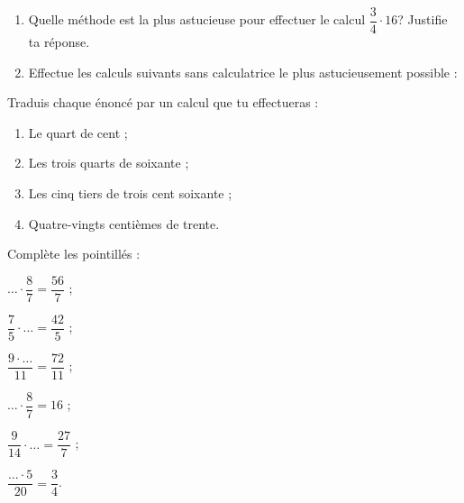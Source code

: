 

\begin{exercice}[Astucieusement]
\begin{enumerate}
 \item Quelle méthode est la plus astucieuse pour effectuer le calcul $\dfrac{3}{4} \cdot 16$? Justifie ta réponse.
 \item Effectue les calculs suivants sans calculatrice le plus astucieusement possible :
 \end{enumerate}
\end{exercice}


\begin{exercice}
Traduis chaque énoncé par un calcul que tu effectueras :
\begin{enumerate}
 \item Le quart de cent ;
 \item Les trois quarts de soixante ;
 \item Les cinq tiers de trois cent soixante ;
 \item Quatre‑vingts centièmes de trente.
 \end{enumerate}
\end{exercice}


\begin{exercice}
Complète les pointillés :
\vspace{0.3em}
 \begin{colenumerate}{2}
  \item $\ldots \cdot \dfrac{8}{7} = \dfrac{56}{7}$ ;
  \vspace{0.4cm}
  \item $\dfrac{7}{5} \cdot \ldots = \dfrac{42}{5}$ ;
  \vspace{0.4cm}
  \item $\dfrac{9 \cdot \ldots}{11} = \dfrac{72}{11}$ ;
  \item $\ldots \cdot \dfrac{8}{7} = 16$ ;
  \item $\dfrac{9}{14} \cdot \ldots = \dfrac{27}{7}$ ;
  \item $\dfrac{\ldots \cdot 5}{20} = \dfrac{3}{4}$.
 \end{colenumerate}
\end{exercice}


